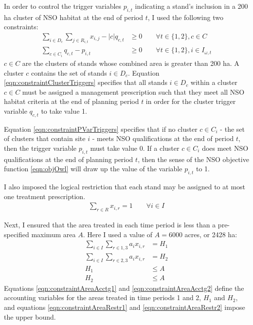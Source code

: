 In order to control the trigger variables $p_{i,t}$ indicating a stand's inclusion in a 200 ha cluster of NSO habitat at the end of period $t$, I used the following two constraints:
\begin{align}
\sum_{i \in D_c} \sum_{j \in R_{i,t}} x_{i,j} - |c| q_{c,t} &\ge 0 \qquad \forall t \in \{1,2\}, c \in C\\
\sum_{c \in C_i} q_{c,t} - p_{i,t} &\ge 0 \qquad \forall t \in \{1,2\}, i \in I_{\omega,t}
\end{align}
$c \in C$ are the clusters of stands whose combined area is greater than 200 ha. A cluster $c$ contains the set of stands $i \in D_c$. Equation \eqref{eqn:constraintClusterTriggers} specifies that all stands $i \in D_c$ within a cluster $c \in C$ must be assigned a management prescription such that they meet all NSO habitat criteria at the end of planning period $t$ in order for the cluster trigger variable $q_{c,t}$ to take value 1.

Equation \eqref{eqn:constraintPVarTriggers} specifies that if no cluster $c \in C_i$ - the set of clusters that contain site $i$ - meets NSO qualifications at the end of period $t$, then the trigger variable $p_{i,t}$ must take value 0. If a cluster $c \in C_i$ does meet NSO qualifications at the end of planning period $t$, then the sense of the NSO objective function \eqref{eqn:objOwl} will draw up the value of the variable $p_{i,t}$ to 1.

I also imposed the logical restriction that each stand may be assigned to at most one treatment prescription.
\begin{align}
\sum_{r \in R} x_{i,r} = 1  \qquad \forall i \in I
\end{align}

Next, I ensured that the area treated in each time period is less than a pre-specified maximum area $A$. Here I used a value of $A = 6000$ acres, or 2428 ha:
\begin{align}
\sum_{i \in I} \sum_{r \in 1,3} a_i x_{i,r} &= H_1 \\
\sum_{i \in I} \sum_{r \in 2,3} a_i x_{i,r} &= H_2 \\
H_1 &\le A\\
H_2 &\le A
\end{align}
Equations \ref{eqn:constraintAreaAcctg1} and \ref{eqn:constraintAreaAcctg2} define the accounting variables for the areas treated in time periods 1 and 2, $H_1$ and $H_2$, and equations \ref{eqn:constraintAreaRestr1} and \ref{eqn:constraintAreaRestr2} impose the upper bound.

